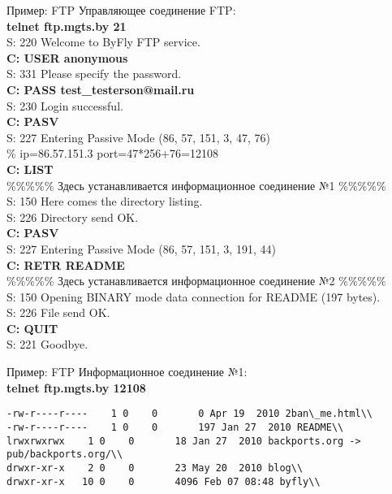 \begin{frame}{Пример: FTP}
Управляющее соединение FTP:\\
\medskip
\tiny
	{\bfseries telnet ftp.mgts.by 21}\\
	S: 220 Welcome to ByFly FTP service.\\
	{\bfseries C: USER anonymous}\\
	S: 331 Please specify the password.\\
	{\bfseries C: PASS test\_testerson@mail.ru}\\
	S: 230 Login successful.\\
	{\bfseries C: PASV}\\
	S: 227 Entering Passive Mode (86, 57, 151, 3, 47, 76)\\
	\% ip=86.57.151.3 port=47*256+76=12108\\
	{\bfseries C: LIST}\\
	\%\%\%\%\% Здесь устанавливается информационное соединение №1 \%\%\%\%\%\\
	S: 150 Here comes the directory listing.\\
	S: 226 Directory send OK.\\
	{\bfseries C: PASV}\\
	S: 227 Entering Passive Mode (86, 57, 151, 3, 191, 44)\\
	{\bfseries C: RETR README}\\
	\%\%\%\%\% Здесь устанавливается информационное соединение №2 \%\%\%\%\%\\
	S: 150 Opening BINARY mode data connection for README (197 bytes).\\
	S: 226 File send OK.\\
	{\bfseries C: QUIT}\\
	S: 221 Goodbye.\\

\normalsize
\end{frame}

\begin{frame}{Пример: FTP}
Информационное соединение №1:\\
\medskip
\scriptsize
{\bfseries telnet ftp.mgts.by 12108}\\
\begin{verbatim}
-rw-r----r----    1 0    0       0 Apr 19  2010 2ban\_me.html\\
-rw-r----r----    1 0    0       197 Jan 27  2010 README\\
lrwxrwxrwx    1 0    0       18 Jan 27  2010 backports.org -> pub/backports.org/\\
drwxr-xr-x    2 0    0       23 May 20  2010 blog\\
drwxr-xr-x   10 0    0       4096 Feb 07 08:48 byfly\\
\end{verbatim}
\normalsize
\end{frame}

